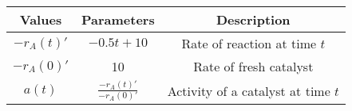 
\begin{tabular}{|c|c|c|}
\hline
\textbf{Values} & \textbf{Parameters} & \textbf{Description} \\
\hline
$-r_A(t)'$ & $-0.5t+10 $ & Rate of reaction at time $t$  \\
\hline
$-r_A(0)'$ & 10  & Rate of fresh catalyst  \\
\hline
$a(t)$ & $\frac{-r_A(t)'}{-r_A(0)'}$ & Activity of a catalyst at time $t$ \\
\hline

\end{tabular}




